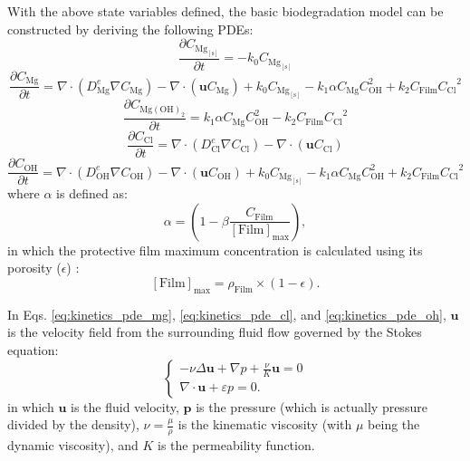 With the above state variables defined, the basic biodegradation model can be constructed by deriving the following PDEs:
\begin{equation} \label{eq:kinetics_pde_mg_solid}
\frac{\partial C_{\mathrm{Mg}_\mathrm{[s]}}}{\partial t}=-k_{0}C_{\mathrm{Mg}_\mathrm{[s]}}
\end{equation}
\begin{equation} \label{eq:kinetics_pde_mg}
\frac{\partial C_{\mathrm{Mg}}}{\partial t}=\nabla \cdot \left(D_{\mathrm{Mg}}^{e}  \nabla C_{\mathrm{Mg}} \right)-\nabla \cdot \left({\mathbf u} C_{\mathrm{Mg}} \right)+k_{0}C_{\mathrm{Mg}_\mathrm{[s]}}-k_{1}\alpha C_{\mathrm{Mg}}C_{\mathrm{OH}}^2 +k_{2} C_{\mathrm{Film}} {C_{\mathrm{Cl}}}^{2}
\end{equation}
\begin{equation} \label{eq:kinetics_pde_film}
\frac{\partial C_{\mathrm{Mg}(\mathrm{OH})_{2}}}{\partial t}=k_{1}\alpha C_{\mathrm{Mg}}C_{\mathrm{OH}}^2 -k_{2} C_{\mathrm{Film}} {C_{\mathrm{Cl}}}^{2}
\end{equation}
\begin{equation} \label{eq:kinetics_pde_cl}
\frac{\partial C_{\mathrm{Cl}}}{\partial t}=\nabla \cdot \left(D_{\mathrm{Cl}}^{e}  \nabla C_{\mathrm{Cl}} \right)-\nabla \cdot \left({\mathbf u} C_{\mathrm{Cl}} \right)
\end{equation}
\begin{equation} \label{eq:kinetics_pde_oh}
\frac{\partial C_{\mathrm{OH}}}{\partial t}=\nabla \cdot \left(D_{\mathrm{OH}}^{e}  \nabla C_{\mathrm{OH}} \right)-\nabla \cdot \left({\mathbf u} C_{\mathrm{OH}} \right)+k_{0}C_{\mathrm{Mg}_\mathrm{[s]}}-k_{1}\alpha C_{\mathrm{Mg}}C_{\mathrm{OH}}^2 +k_{2} C_{\mathrm{Film}} {C_{\mathrm{Cl}}}^{2}
\end{equation}
where $\alpha$ is defined as:
\begin{equation} \label{eq:kinetics_film_alpha}
\alpha=\left(1-\beta \frac{C_{\mathrm{Film}}}{[\mathrm{Film}]_{\max }}\right),
\end{equation}
in which the protective film maximum concentration is calculated using its porosity ($\epsilon$) \cite{Bajger2016}:
\begin{equation} \label{eq:kinetics_film_max}
[\mathrm{Film}]_{\max }=\rho_{\mathrm{Film}} \times(1-\epsilon).
\end{equation}

In Eqs. \ref{eq:kinetics_pde_mg}, \ref{eq:kinetics_pde_cl}, and \ref{eq:kinetics_pde_oh}, $\mathbf{u}$ is the velocity field from the surrounding fluid flow governed by the Stokes equation:
\begin{equation} \label{eq:kinetics_stokes}
\left\{ {\begin{array}{*{20}{l}}
\displaystyle  {- \nu\Delta \mathbf{u} + \nabla p + \frac{\nu}{K} \mathbf{u} = 0} \\
\displaystyle  {\nabla\cdot\mathbf{u} + \varepsilon p = 0.}
\end{array}} \right.
\end{equation}
in which $\mathbf{u}$ is the fluid velocity, $\mathbf{p}$ is the pressure (which is actually pressure divided by the density), $\nu = \frac{\mu}{\rho}$ is the kinematic viscosity (with $\mu$ being the dynamic viscosity), and $K$ is the permeability function.

